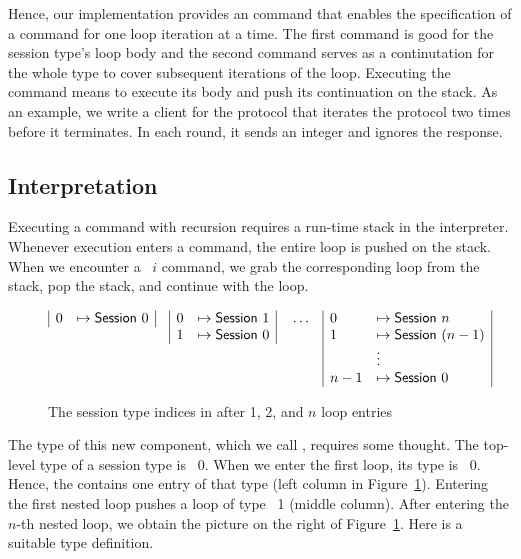 \documentclass[acmsmall,review,anonymous,screen]{acmart}
\begin{document}
Hence, our implementation provides an {\AUNROLL} command that
enables the specification of a command for one loop iteration at a time.
\rstCommandUNROLL
The first command is good for the session type's loop body and the
second command serves as a continutation for the whole type to cover subsequent
iterations of the loop. 
Executing the {\AUNROLL} command means to execute its body and push its
continuation on the stack.
\rstExecutorUNROLL
As an example, we write a client for the {\Amanyunaryp} protocol that
iterates the protocol two times before it terminates. In each round,
it sends an integer and ignores the response.
\rstClientExample

\subsection{Interpretation}
\label{sec:interpretaion}


Executing a command with recursion requires a run-time stack in the
interpreter. Whenever execution enters a {\AMU} command, the entire
loop is pushed on the stack. When we encounter a {\ACONTINUE~$i$}
command, we grab the corresponding loop from the stack, pop the stack, and
continue with the loop.

\begin{figure}[tp]
  \begin{align*}
    &
      \begin{array}[t]{|ll|}
        0 &\mapsto \ASession~0
      \end{array}
    &&
      \begin{array}[t]{|ll|}
        0 &\mapsto \ASession~1 \\
        1 &\mapsto \ASession~0
      \end{array}
          &&
             \dots
    &&
       \begin{array}[t]{|ll|}
         0 & \mapsto \ASession~n \\
         1 & \mapsto \ASession~(n-1) \\
           & \vdots \\
         n-1 & \mapsto \ASession~0
       \end{array}
  \end{align*}
  \caption{The session type indices in {\ACommandStack} after 1, 2, and $n$ loop entries}
  \label{fig:commandstore}
\end{figure}
The type of this new
component, which we call {\ACommandStack}, requires some thought.  The top-level type of a session type is
{\ASession~0}. When we enter the first loop, its type is {\ASession~0}. Hence, the {\ACommandStack} contains
one entry of that type (left column in Figure~\ref{fig:commandstore}).
Entering the first nested loop pushes a loop of type {\ASession~1}
(middle column). After entering the $n$-th nested loop, we obtain the
picture on the right of Figure~\ref{fig:commandstore}. Here is a
suitable type definition.
\rstCommandStack
\end{document}
